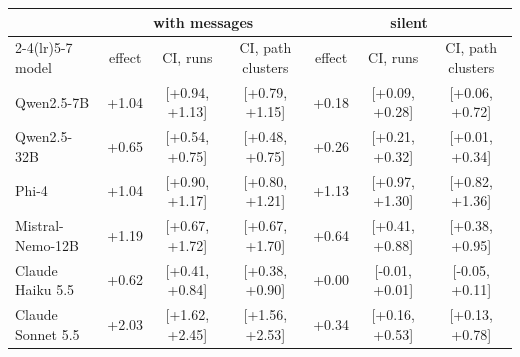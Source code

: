\begin{tabular}{lcccccc}
\toprule
 & \multicolumn{3}{c}{with messages} & \multicolumn{3}{c}{silent}\\
\cmidrule(lr){2-4}\cmidrule(lr){5-7}
model & effect & CI, runs & CI, path clusters & effect & CI, runs & CI, path clusters \\
\midrule
Qwen2.5-7B & +1.04 & [+0.94, +1.13] & [+0.79, +1.15] & +0.18 & [+0.09, +0.28] & [+0.06, +0.72] \\
Qwen2.5-32B & +0.65 & [+0.54, +0.75] & [+0.48, +0.75] & +0.26 & [+0.21, +0.32] & [+0.01, +0.34] \\
Phi-4 & +1.04 & [+0.90, +1.17] & [+0.80, +1.21] & +1.13 & [+0.97, +1.30] & [+0.82, +1.36] \\
Mistral-Nemo-12B & +1.19 & [+0.67, +1.72] & [+0.67, +1.70] & +0.64 & [+0.41, +0.88] & [+0.38, +0.95] \\
Claude Haiku 5.5 & +0.62 & [+0.41, +0.84] & [+0.38, +0.90] & +0.00 & [-0.01, +0.01] & [-0.05, +0.11] \\
Claude Sonnet 5.5 & +2.03 & [+1.62, +2.45] & [+1.56, +2.53] & +0.34 & [+0.16, +0.53] & [+0.13, +0.78] \\
\bottomrule
\end{tabular}
